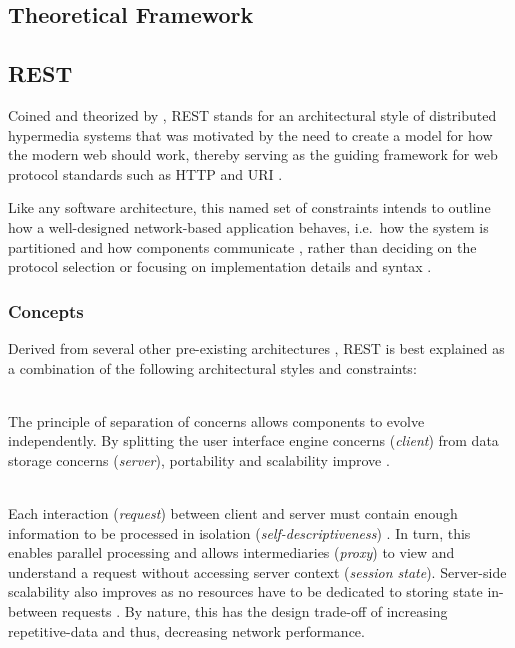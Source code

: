 
\begin{appendices}

\chapter{Theoretical Framework}
\label{app:theoretical-framework}

\section{\acl{REST}}
\label{sec:rest}

Coined and theorized by \citeauthor{fielding2000architectural}, \ac{REST} stands for an architectural style of distributed hypermedia systems that was motivated by the need to create a model for how the modern web should work, thereby serving as the guiding framework for web protocol standards such as \acs{HTTP} and \acs{URI} \cite[pp.~76,~107]{fielding2000architectural}.

Like any software architecture, this named set of constraints intends to outline how a well-designed network-based application behaves, i.e.~how the system is partitioned and how components communicate \cite[p.~xvi]{fielding2000architectural}, rather than deciding on the protocol selection or focusing on implementation details and syntax \cite[pp.~86,~109]{fielding2000architectural}.


\subsection{Concepts}
\label{sec:rest-concepts}

Derived from several other pre-existing architectures \cite[p.~76]{fielding2000architectural}, \ac{REST} is best explained as a combination of the following architectural styles and constraints:

\begin{description}[format={\storedescriptionlabel}]
	\item[Client-server]
	\hfill \\
	The principle of separation of concerns allows components to evolve independently. By splitting the user interface engine concerns (\textit{client}) from data storage concerns (\textit{server}), portability and scalability improve \cite[p.~78]{fielding2000architectural}.

	\item[Stateless]
	\hfill \\
	Each interaction (\textit{request}) between client and server must contain enough information to be processed in isolation (\textit{self-descriptiveness}) \cite[pp.~78--79]{fielding2000architectural}. In turn, this enables parallel processing and allows intermediaries (\textit{proxy}) to view and understand a request without accessing server context (\textit{session state}). Server-side scalability also improves as no resources have to be dedicated to storing state in-between requests \cite[pp.~79, 93]{fielding2000architectural}. By nature, this has the design trade-off of increasing repetitive-data and thus, decreasing network performance.


\end{description}
\end{appendices}
